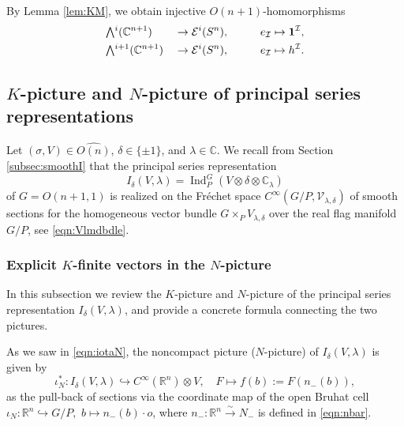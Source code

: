 By Lemma \ref{lem:KM}, 
 we obtain injective $O(n+1)$-homomorphisms
\begin{alignat*}{3}
&\Exterior^{i}({\mathbb{C}}^{n+1})
&&\to 
{\mathcal{E}}^i(S^n), 
\qquad
&&e_{\mathcal{I}} \mapsto {\bf{1}}^{\mathcal{I}}, 
\\
&\Exterior^{i+1}({\mathbb{C}}^{n+1})
&&\to 
{\mathcal{E}}^i(S^n),  
\qquad
&&e_{\mathcal{I}} \mapsto h^{\mathcal{I}}.  
\end{alignat*}

\subsection{$K$-picture and $N$-picture of principal series representations}
\label{subsec:psKN}



Let $(\sigma, V) \in \widehat {O(n)}$, 
 $\delta \in \{\pm 1\}$, 
 and $\lambda \in {\mathbb{C}}$.  
We recall from Section \ref{subsec:smoothI}
 that the principal series representation
\[
 I_{\delta}(V,\lambda)
 =
 {\operatorname{Ind}}_P^G(V \otimes \delta \otimes {\mathbb{C}}_{\lambda})
\]
 of $G=O(n+1,1)$
 is realized on the Fr{\'e}chet space
 $C^{\infty}(G/P, {\mathcal{V}}_{\lambda,\delta})$
 of smooth sections for the homogeneous vector bundle
 $G \times_P V_{\lambda, \delta}$ 
over the real flag manifold $G/P$, 
 see \eqref{eqn:Vlmdbdle}. 

\subsubsection{Explicit $K$-finite vectors in the $N$-picture} 
In this subsection we review
 the 
$K$-picture and
$N$-picture
 of the principal series representation $I_{\delta}(V,\lambda)$,
 and provide a concrete formula
 connecting the two pictures.  



As we saw in \eqref{eqn:iotaN}, 
 the noncompact picture ($N$-picture) of $I_{\delta}(V,\lambda)$
 is given by
\[
  \iota_N^{\ast} \colon 
  I_{\delta}(V,\lambda) \hookrightarrow C^{\infty}({\mathbb{R}}^n) \otimes V, 
\quad
  F \mapsto f(b):=F(n_-(b)), 
\]
 as the pull-back of sections
 via the coordinate map of the open Bruhat cell
$
  \iota_N \colon {\mathbb{R}}^n \hookrightarrow G/P, 
$
$b \mapsto n_-(b) \cdot o$, 
 where $n_- \colon {\mathbb{R}}^n \overset \sim \to N_-$
 is defined in \eqref{eqn:nbar}.  



